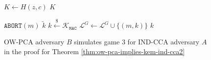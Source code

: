 \documentclass[runningheads]{llncs}
\newcommand{\mac}{\texttt{MAC}}
\newcommand{\pco}{\texttt{PCO}}
\newcommand{\leftsample}{\stackrel{\$}{\leftarrow}}
\begin{document}
\begin{figure}[H]
\begin{minipage}[t]{0.49\textwidth}
\begin{algorithm}[H]
\begin{algorithmic}[1]
                \Else
                    \State $K \leftarrow H(z, c)$
                \EndIf
                \State \Return $K$
            \end{algorithmic}
        \end{algorithm}
        \begin{algorithm}[H]
            \caption*{$\mathcal{O}^G_B(m)$}
            \begin{algorithmic}[1]
                \If{$\pco(m, {c^\prime}^\ast) = 1$}
                    \State $\texttt{ABORT}(m)$
                \EndIf
                    \State \Return $\tilde{k}$
                \EndIf
                \State $k \leftsample \mathcal{K}_\mac$
                \State $\mathcal{L}^G \leftarrow \mathcal{L}^G \cup \{(m, k)\}$
                \State \Return $k$
            \end{algorithmic}
        \end{algorithm}
    \end{minipage}
    \caption{OW-PCA adversary $B$ simulates game 3 for IND-CCA adversary $A$ in the proof for Theorem \ref{thm:ow-pca-implies-kem-ind-cca2}}\label{fig:ow-pca-simulates-game-3}
\end{figure}
\end{document}
